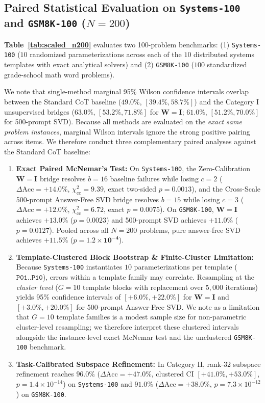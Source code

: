 \documentclass[10pt,twocolumn]{article}
\begin{document}
\subsection{Paired Statistical Evaluation on \texttt{Systems-100} and \texttt{GSM8K-100} ($N = 200$)}
\label{sec:scaled_eval}
\textbf{Table~\ref{tab:scaled_n200}} evaluates two 100-problem benchmarks: (1) \texttt{Systems-100} ($10$ randomized parameterizations across each of the $10$ distributed systems templates with exact analytical solvers) and (2) \texttt{GSM8K-100} ($100$ standardized grade-school math word problems).

We note that single-method marginal 95\% Wilson confidence intervals overlap between the Standard CoT baseline ($49.0\%$, $[39.4\%, 58.7\%]$) and the Category I unsupervised bridges ($63.0\%$, $[53.2\%, 71.8\%]$ for $\mathbf{W}=\mathbf{I}$; $61.0\%$, $[51.2\%, 70.0\%]$ for 500-prompt SVD). Because all methods are evaluated on the \emph{exact same problem instances}, marginal Wilson intervals ignore the strong positive pairing across items. We therefore conduct three complementary paired analyses against the Standard CoT baseline:
\begin{enumerate}
    \item \textbf{Exact Paired McNemar's Test:} On \texttt{Systems-100}, the Zero-Calibration $\mathbf{W}=\mathbf{I}$ bridge resolves $b=16$ baseline failures while losing $c=2$ ($\Delta\text{Acc} = +14.0\%$, $\chi^2_{\text{cc}} = 9.39$, exact two-sided $p = \mathbf{0.0013}$), and the Cross-Scale 500-prompt Answer-Free SVD bridge resolves $b=15$ while losing $c=3$ ($\Delta\text{Acc} = +12.0\%$, $\chi^2_{\text{cc}} = 6.72$, exact $p = \mathbf{0.0075}$). On \texttt{GSM8K-100}, $\mathbf{W}=\mathbf{I}$ achieves $+13.0\%$ ($p = \mathbf{0.0023}$) and 500-prompt SVD achieves $+11.0\%$ ($p = \mathbf{0.0127}$). Pooled across all $N=200$ problems, pure answer-free SVD achieves $+11.5\%$ ($p = \mathbf{1.2\times 10^{-4}}$).
    \item \textbf{Template-Clustered Block Bootstrap \& Finite-Cluster Limitation:} Because \texttt{Systems-100} instantiates $10$ parameterizations per template ($\texttt{P01}..\texttt{P10}$), errors within a template family may correlate. Resampling at the \emph{cluster level} ($G=10$ template blocks with replacement over $5,000$ iterations) yields 95\% confidence intervals of $[+6.0\%, +22.0\%]$ for $\mathbf{W}=\mathbf{I}$ and $[+3.0\%, +20.0\%]$ for 500-prompt Answer-Free SVD. We note as a limitation that $G=10$ template families is a modest sample size for non-parametric cluster-level resampling; we therefore interpret these clustered intervals alongside the instance-level exact McNemar test and the unclustered \texttt{GSM8K-100} benchmark.
    \item \textbf{Task-Calibrated Subspace Refinement:} In Category II, rank-$32$ subspace refinement reaches $\mathbf{96.0\%}$ ($\Delta\text{Acc} = +47.0\%$, clustered CI $[+41.0\%, +53.0\%]$, $p = 1.4\times 10^{-14}$) on \texttt{Systems-100} and $\mathbf{91.0\%}$ ($\Delta\text{Acc} = +38.0\%$, $p = 7.3\times 10^{-12}$) on \texttt{GSM8K-100}.
\end{enumerate}
\end{document}
